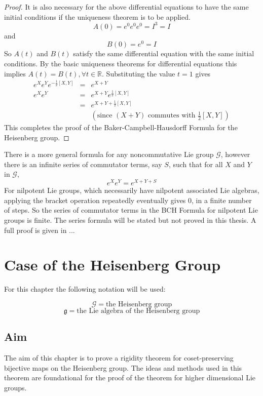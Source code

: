 \documentclass[honours]{UNSWthesis}
\newcommand{\R}{\mathbb{R}}
\newcommand{\G}{\mathcal{G}}
\newcommand{\g}{\mathfrak{g}}
\newcommand{\1}{\mathbf{e}_{1}}
\newcommand{\2}{\mathbf{e}_{3}}
\newcommand{\3}{\mathbf{e}_{3}}
\begin{document}
\begin{proof}
It is also necessary for the above differential equations to have the same initial conditions if the uniqueness theorem is to be applied. 
\[
A(0)=e^{0}e^{0}e^{0}=I^{3}=I
\]
and 
\[
B(0)=e^{0}=I
\]
So $A(t)$ and $B(t)$ satisfy the same differential equation with the same initial conditions. By the basic uniqueness theorems for differential equations this implies $A(t)=B(t), \forall t \in \R$. Substituting the value $t=1$ gives 
\begin{eqnarray*}
e^{X}e^{Y}e^{-\frac{1}{2}[X,Y]} &=&e^{X+Y} \\
e^{X}e^{Y} &=& e^{X+Y}e^{\frac{1}{2}[X,Y]} \\
&=& e^{X+Y+\frac{1}{2}[X,Y]} \\
& & (\text{since $(X+Y)$ commutes with $\frac{1}{2}[X,Y]$})
\end{eqnarray*}
This completes the proof of the Baker-Campbell-Hausdorff Formula for the Heisenberg group. 
\end{proof}

There is a more general formula for any noncommutative Lie group $\G$, however there is an infinite series of commutator terms, say $S$, such that for all $X$ and $Y$ in $\G$,
\[
e^{X}e^{Y}=e^{X+Y+S}
\]
For nilpotent Lie groups, which necessarily have nilpotent associated Lie algebras, applying the bracket operation repeatedly eventually gives $0$, in a finite number of steps. So the series of commutator terms in the BCH Formula for nilpotent Lie groups is finite.
The series formula will be stated but not proved in this thesis. A full proof is given in ...




\chapter{Case of the Heisenberg Group}
For this chapter the following notation will be used:

$$\G=\text{the Heisenberg group}$$
$$\g=\text{the Lie algebra of the Heisenberg group}$$

\section{Aim}
The aim of this chapter is to prove a rigidity theorem for coset-preserving bijective maps on the Heisenberg group. The ideas and methods used in this theorem are foundational for the proof of the theorem for higher dimensional Lie groups. 
\end{document}
